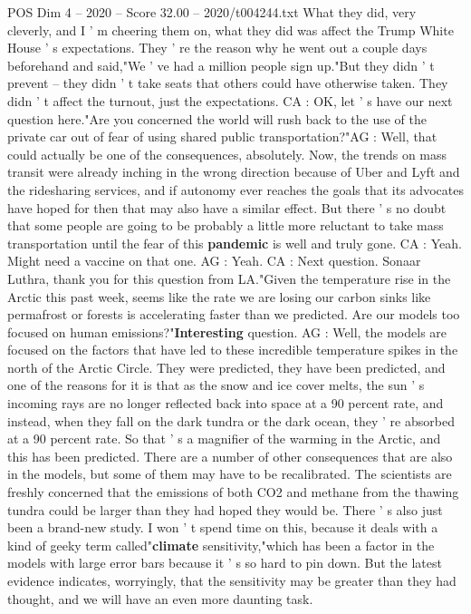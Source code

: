 \begin{textsample}{POS Dim 4 – 2020 – Score 32.00 – 2020/t004244.txt}
What they did, very cleverly, and I ' m cheering them on, what they did was affect the Trump White House ' s expectations.
They ' re the reason why he went out a couple days beforehand and said,"We ' ve had a million people sign up."But they didn ' t prevent -- they didn ' t take seats that others could have otherwise taken.
They didn ' t affect the turnout, just the expectations.
CA : OK, let ' s have our next question here."Are you concerned the world will rush back to the use of the private car out of fear of using shared public transportation?"AG : Well, that could actually be one of the consequences, absolutely.
Now, the trends on mass transit were already inching in the wrong direction because of Uber and Lyft and the ridesharing services, and if autonomy ever reaches the goals that its advocates have hoped for then that may also have a similar effect.
But there ' s no doubt that some people are going to be probably a little more reluctant to take mass transportation until the fear of this \textbf{pandemic} is well and truly gone.
CA : Yeah.
Might need a vaccine on that one.
AG : Yeah.
CA : Next question.
Sonaar Luthra, thank you for this question from LA."Given the temperature rise in the Arctic this past week, seems like the rate we are losing our carbon sinks like permafrost or forests is accelerating faster than we predicted.
Are our models too focused on human emissions?"\textbf{Interesting} question.
AG : Well, the models are focused on the factors that have led to these incredible temperature spikes in the north of the Arctic Circle.
They were predicted, they have been predicted, and one of the reasons for it is that as the snow and ice cover melts, the sun ' s incoming rays are no longer reflected back into space at a 90 percent rate, and instead, when they fall on the dark tundra or the dark ocean, they ' re absorbed at a 90 percent rate.
So that ' s a magnifier of the warming in the Arctic, and this has been predicted.
There are a number of other consequences that are also in the models, but some of them may have to be recalibrated.
The scientists are freshly concerned that the emissions of both CO2 and methane from the thawing tundra could be larger than they had hoped they would be.
There ' s also just been a brand-new study.
I won ' t spend time on this, because it deals with a kind of geeky term called"\textbf{climate} sensitivity,"which has been a factor in the models with large error bars because it ' s so hard to pin down.
But the latest evidence indicates, worryingly, that the sensitivity may be greater than they had thought, and we will have an even more daunting task.

\end{textsample}
